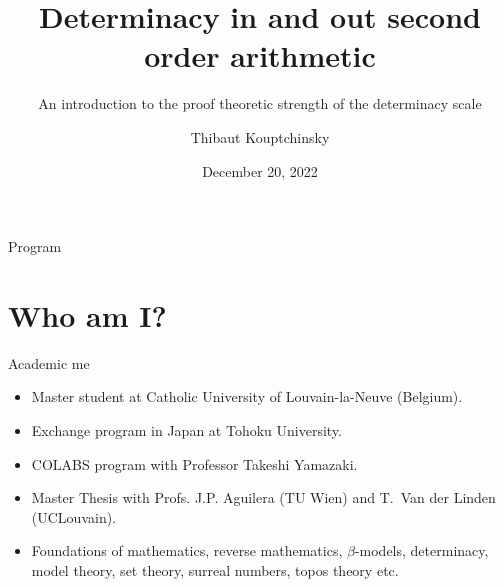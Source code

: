 \documentclass{beamer} %
\title[Determinacy axioms]{Determinacy in and out second order arithmetic}
\subtitle[]{An introduction to the proof theoretic strength of the determinacy scale}
\institute[Proof Theory Conference]{Proof Theory Conference \and UCLouvain}
\author{Thibaut Kouptchinsky}
\date{December 20, 2022}
\begin{document}
\begin{frame}
	\titlepage
\end{frame}


\begin{frame}{Program}
    \tableofcontents
\end{frame}


\section{Who am I?}

\begin{frame}{Academic me}
    \begin{itemize}
        \item<1-> Master student at Catholic University of Louvain-la-Neuve (Belgium).
        \item<2-> Exchange program in Japan at Tohoku University.
        \item<3-> COLABS program with Professor Takeshi Yamazaki.
        \item<4-> Master Thesis with Profs. J.P. Aguilera (TU Wien) and T.~Van der Linden (UCLouvain).
        \item<5-> Foundations of mathematics, reverse mathematics, $\beta$-models, determinacy, model theory,
          set theory, surreal numbers, topos theory etc. 
    \end{itemize}
\end{frame}

\end{document}
